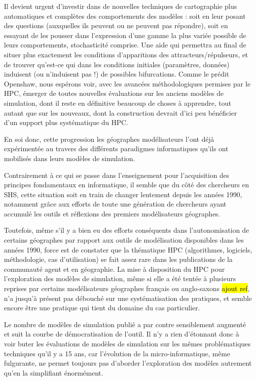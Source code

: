 Il devient urgent d'investir dans de nouvelles techniques de cartographie plus automatiques et complètes des comportements des modèles : soit en leur posant des questions (auxquelles ils peuvent ou ne peuvent pas répondre), soit en essayant de les pousser dans l'expression d'une gamme la plus variée possible de leurs comportements, stochasticité comprise. Une aide qui permettra au final de situer plus exactement les conditions d'apparitions des attracteurs/répulseurs, et de trouver qu'est-ce qui dans les conditions initiales (paramètres, données) induisent (ou n'induisent pas !) de possibles bifurcations. Comme le prédit Openshaw, nous espérons voir, avec les avancées méthodologiques permises par le HPC, émerger de toutes nouvelles évaluations sur les anciens modèles de simulation, dont il reste en définitive beaucoup de choses à apprendre, tout autant que sur les nouveaux, dont la construction devrait d'ici peu bénéficier d'un support plus systématique du HPC.

En soi donc, cette progression les géographes modélisateurs l'ont déjà expérimentée au travers des différents paradigmes informatiques qu'ils ont mobilisés dans leurs modèles de simulation.

Contrairement à ce qui se passe dans l'enseignement pour l'acquisition des principes fondamentaux en informatique, il semble que du côté des chercheurs en SHS, cette situation soit en train de changer lentement depuis les années 1990, notamment grâce aux efforts de toute une génération de chercheurs ayant accumulé les outils et réflexions des premiers modélisateurs géographes.

Toutefois, même s'il y a bien eu des efforts conséquents dans l'autonomisation de certains géographes par rapport aux outils de modélisation disponibles dans les années 1990, force est de constater que la thématique HPC (algorithmes, logiciels, méthodologie, cas d'utilisation) se fait assez rare dans les publications de la communauté agent et en géographie. La mise à disposition du HPC pour l'exploration des modèles de simulation, même si elle a été tentée à plusieurs reprises par certains modélisateurs géographes français ou anglo-saxons \autocite{Heppenstall2007} \hl{ajout ref}, n'a jusqu'à présent pas débouché sur une systématisation des pratiques, et semble encore être une pratique qui tient du domaine du cas particulier.

Le nombre de modèles de simulation publié a par contre sensiblement augmenté et suit la courbe de démocratisation de l'outil. Il n'y a rien d'étonnant donc à voir buter les évaluations de modèles de simulation sur les mêmes problématiques techniques qu'il y a 15 ans, car l'évolution de la micro-informatique, même fulgurante, ne permet toujours pas d'aborder l'exploration des modèles autrement qu'en la simplifiant énormément.

